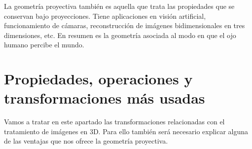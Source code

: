 \documentclass[a4,10pt]{article}
\begin{document}
La geometría proyectiva también es aquella que trata las propiedades que se conservan bajo proyecciones. Tiene aplicaciones en visión artificial, funcionamiento de cámaras, reconstrucción de imágenes bidimensionales en tres dimensiones, etc. En resumen es la geometría asociada al modo en que el ojo humano percibe el mundo.

\section{Propiedades, operaciones y transformaciones más usadas}

Vamos a tratar en este apartado las transformaciones relacionadas con el tratamiento de imágenes en 3D. Para ello también será necesario explicar alguna de las ventajas que nos ofrece la geometría proyectiva.\\
\end{document}
